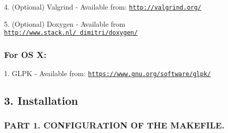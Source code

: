 \begin{DoxyPre}4. (Optional) Valgrind - Available from: \href{http://valgrind.org/}{\tt http://valgrind.org/}\end{DoxyPre}



\begin{DoxyPre}5. (Optional) Doxygen - Available from \href{http://www.stack.nl/~dimitri/doxygen/}{\tt http://www.stack.nl/~dimitri/doxygen/}\end{DoxyPre}



\begin{DoxyPre}\subsubsection*{For OS X:}\end{DoxyPre}



\begin{DoxyPre}\end{DoxyPre}



\begin{DoxyPre}1. GLPK - Available from: \href{https://www.gnu.org/software/glpk/}{\tt https://www.gnu.org/software/glpk/}\end{DoxyPre}



\begin{DoxyPre}\subsection*{3. Installation}\end{DoxyPre}



\begin{DoxyPre}\end{DoxyPre}



\begin{DoxyPre}\subsubsection*{PART 1. CONFIGURATION OF THE MAKEFILE.}\end{DoxyPre}



\begin{DoxyPre}\end{DoxyPre}




